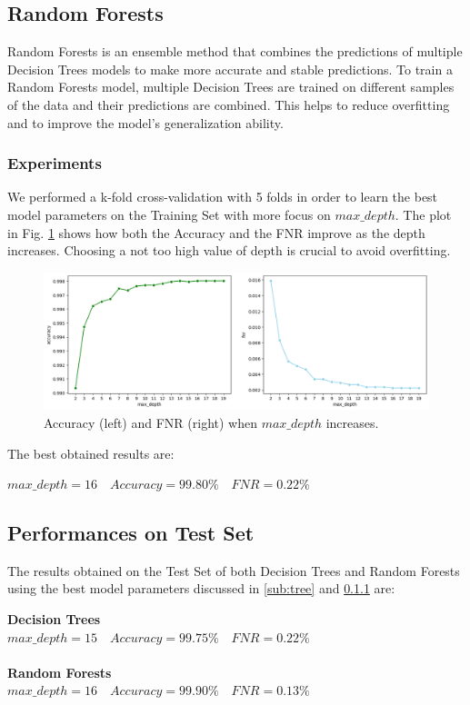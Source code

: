\documentclass[twocolumn, switch]{article} %
\newcommand\x{0.7}
\begin{document}
\subsection{Random Forests}
Random Forests is an ensemble method that combines the predictions of multiple Decision Trees models to make more accurate and stable predictions.
To train a Random Forests model, multiple Decision Trees are trained on different samples of the data and their predictions are combined. This helps to reduce overfitting and to improve the model's generalization ability.

\subsubsection{Experiments}
\label{sub:randomforest}
We performed a k-fold cross-validation with 5 folds in order to learn the best model parameters on the Training Set with more focus on $max\_depth$. The plot in Fig. \ref{fig:foresttrain} shows how both the Accuracy and the FNR improve as the depth increases. Choosing a not too high value of depth is crucial to avoid overfitting.

\begin{figure}[ht!]
	\centering
	\includegraphics[width=\x\linewidth]{randomforest_accuracy_fnr.png}
	\caption{Accuracy (left) and FNR (right) when $max\_depth$ increases.}
	\label{fig:foresttrain}
\end{figure}
The best obtained results are:
\begin{center}
	$max\_depth=16 \quad Accuracy=99.80\% \quad FNR=0.22\%$
\end{center}

\subsection{Performances on Test Set}
The results obtained on the Test Set of both Decision Trees and Random Forests using the best model parameters discussed in \ref{sub:tree} and \ref{sub:randomforest} are:
\begin{center}
	\textbf{Decision Trees}\\
	$max\_depth=15 \quad Accuracy=99.75\% \quad FNR=0.22\%$\\~\\
	\textbf{Random Forests}\\
	$max\_depth=16 \quad Accuracy=99.90\% \quad FNR=0.13\%$
\end{center}
\end{document}
